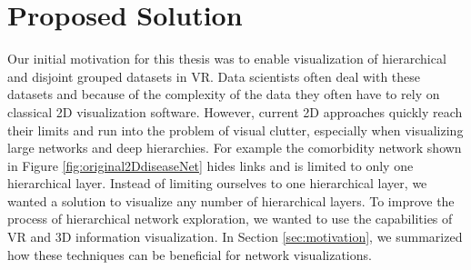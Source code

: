 \chapter{Proposed Solution}
\label{chap:proposed-Solution}

Our initial motivation for this thesis was to enable visualization of hierarchical and disjoint grouped datasets in VR. 
Data scientists often deal with these datasets and because of the complexity of the data they often have to rely on classical 2D visualization software.
However, current 2D approaches quickly reach their limits and run into the problem of visual clutter, especially when visualizing large networks and deep hierarchies. For example the comorbidity network shown in Figure \ref{fig:original2DdiseaseNet} hides links and is limited to only one hierarchical layer. Instead of limiting ourselves to one hierarchical layer, we wanted a solution to visualize any number of hierarchical layers.
To improve the process of hierarchical network exploration, we wanted to use the capabilities of VR and 3D information visualization. In Section \ref{sec:motivation}, we summarized how these techniques can be beneficial for network visualizations.  

